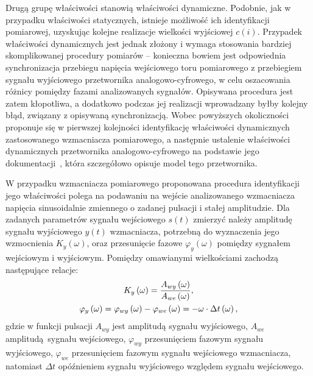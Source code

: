 Drugą grupę właściwości stanowią właściwości dynamiczne. Podobnie, jak w przypadku właściwości statycznych, istnieje możliwość ich identyfikacji pomiarowej, uzyskując kolejne realizacje wielkości wyjściowej $c(i)$. Przypadek właściwości dynamicznych jest jednak złożony i wymaga stosowania bardziej skomplikowanej procedury pomiarów -- konieczna bowiem jest odpowiednia synchronizacja przebiegu napięcia wejściowego toru pomiarowego z przebiegiem sygnału wyjściowego przetwornika analogowo-cyfrowego, w celu oszacowania różnicy pomiędzy fazami analizowanych sygnałów. Opisywana procedura jest zatem kłopotliwa, a dodatkowo podczas jej realizacji wprowadzany byłby kolejny błąd, związany z opisywaną synchronizacją. Wobec powyższych okoliczności proponuje się w pierwszej kolejności identyfikację właściwości dynamicznych zastosowanego wzmacniacza pomiarowego, a następnie ustalenie właściwości dynamicznych przetwornika analogowo-cyfrowego na podstawie jego dokumentacji~\cite{stm_f411}, która szczegółowo opisuje model tego przetwornika.

W przypadku wzmacniacza pomiarowego proponowana procedura identyfikacji jego właściwości polega na podawaniu na wejście analizowanego wzmacniacza napięcia sinusoidalnie zmiennego o zadanej pulsacji i stałej amplitudzie. Dla zadanych parametrów sygnału wejściowego $s(t)$ zmierzyć należy amplitudę sygnału wyjściowego $y(t)$ wzmacniacza, potrzebną do wyznaczenia jego wzmocnienia $K_{y}(\omega)$, oraz przesunięcie fazowe $\varphi_{y}(\omega)$ pomiędzy sygnałem wejściowym i wyjściowym. Pomiędzy omawianymi wielkościami zachodzą następujące relacje:
\begin{gather}
K_{y} \left(\omega\right) = \frac{A_{wy} \left(\omega\right)}{A_{we} \left(\omega\right)} \label{eq:pom_dyn_amp}, \\
\varphi_{y} \left(\omega\right) = \varphi_{wy} \left(\omega\right) - \varphi_{we} \left(\omega\right) = -\omega \cdot \Delta t \left(\omega\right) \label{eq:pom_dyn_phi},
\end{gather}
gdzie w funkcji pulsacji $A_{wy}$ jest amplitudą sygnału wyjściowego, $A_{we}$ amplitudą sygnału wejściowego, $\varphi_{wy}$ przesunięciem fazowym sygnału wyjściowego, $\varphi_{we}$ przesunięciem fazowym sygnału wejściowego wzmacniacza, natomiast $\Delta t$ opóźnieniem sygnału wyjściowego względem sygnału wejściowego.

